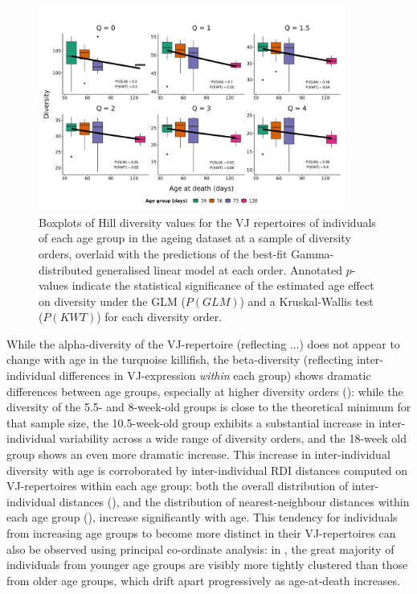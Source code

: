 \begin{figure}
\centering
\includegraphics[width = 0.9\textwidth]{_Figures/png/ageing-VJ-diversity-solo-fit-gamma}
\caption{Boxplots of Hill diversity values for the VJ repertoires of individuals of each age group in the \igseq ageing dataset at a sample of diversity orders, overlaid with the predictions of the best-fit Gamma-distributed generalised linear model at each order.  Annotated $p$-values indicate the statistical significance of the estimated age effect on diversity under the GLM ($P(GLM)$) and a Kruskal-Wallis test ($P(KWT)$) for each diversity order.}
\label{fig:igseq-ageing-VJ-diversity-solo-fit-gamma}
\end{figure}

While the alpha-diversity of the VJ-repertoire (reflecting ...)  does not appear to change with age in the turquoise killifish, the beta-diversity (reflecting inter-individual differences in VJ-expression \textit{within} each group) shows dramatic differences between age groups, especially at higher diversity orders (): while the diversity of the 5.5- and 8-week-old groups is close to the theoretical minimum for that sample size, the 10.5-week-old group exhibits a substantial increase in inter-individual variability across a wide range of diversity orders, and the 18-week old group shows an even more dramatic increase. This increase in inter-individual diversity with age is corroborated by inter-individual RDI distances computed on VJ-repertoires within each age group: both the overall distribution of inter-individual distances (), and the distribution of nearest-neighbour distances within each age group (), increase significantly with age. This tendency for individuals from increasing age groups to become more distinct in their VJ-repertoires can also be observed using principal co-ordinate analysis:  in , the great majority of individuals from younger age groups are visibly more tightly clustered than those from older age groups, which drift apart progressively as age-at-death increases.

